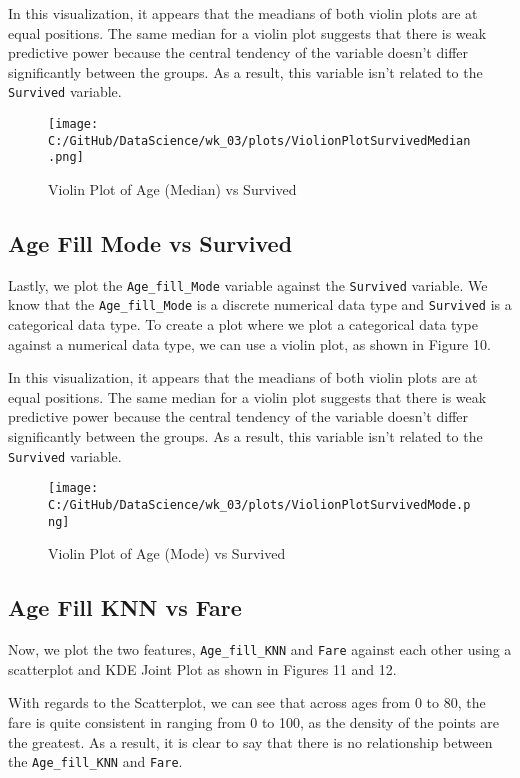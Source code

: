 \documentclass[a4paper, twocolumn]{article}
\begin{document}
In this visualization, it appears that the meadians of both violin plots are at equal positions. The same median
for a violin plot suggests that there is weak predictive power because the central tendency of the variable doesn't
differ significantly between the groups. As a result, this variable isn't related to the \texttt{Survived} variable.

\begin{figure}[h!] 
    \centering
    \noindent
    \texttt{[image: C:/GitHub/DataScience/wk\_03/plots/ViolionPlotSurvivedMedian.png]}  
    \caption{Violin Plot of Age (Median) vs Survived} 
\end{figure}

\subsection{Age Fill Mode vs Survived}
Lastly, we plot the \texttt{Age\_fill\_Mode} variable against the \texttt{Survived} variable. We know that the 
\texttt{Age\_fill\_Mode} is a discrete numerical data type and \texttt{Survived} is a categorical data type.
To create a plot where we plot a categorical data type against a numerical data type, we can use a violin plot, as
shown in Figure 10.

In this visualization, it appears that the meadians of both violin plots are at equal positions. The same median 
for a violin plot suggests that there is weak predictive power because the central tendency of the variable doesn't
differ significantly between the groups. As a result, this variable isn't related to the \texttt{Survived} variable.

\begin{figure}[h!] 
    \centering
    \noindent
    \texttt{[image: C:/GitHub/DataScience/wk\_03/plots/ViolionPlotSurvivedMode.png]}  
    \caption{Violin Plot of Age (Mode) vs Survived} 
\end{figure}


\subsection{Age Fill KNN vs Fare}
Now, we plot the two features, \texttt{Age\_fill\_KNN} and \texttt{Fare} against each other using a scatterplot and
KDE Joint Plot as shown in Figures 11 and 12.

With regards to the Scatterplot, we can see that across ages from 0 to 80, the fare is quite consistent in ranging 
from 0 to 100, as the density of the points are the greatest. As a result, it is clear to say that there is no
relationship between the \texttt{Age\_fill\_KNN} and \texttt{Fare}.
\end{document}
